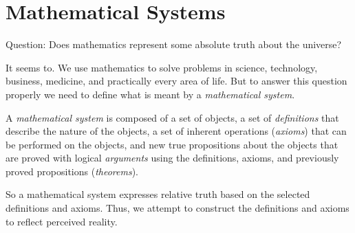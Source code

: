 \documentclass[letterpaper,12pt,fleqn]{article}
\begin{document}
\section*{Mathematical Systems}

Question: Does mathematics represent some absolute truth about the universe?

It seems to.  We use mathematics to solve problems in science, technology, business, medicine, and practically every
area of life.  But to answer this question properly we need to define what is meant by a
\emph{mathematical system}.

\begin{definition}
  A \emph{mathematical system} is composed of a set of objects, a set of \emph{definitions} that describe the
  nature of the objects, a set of inherent operations (\emph{axioms}) that can be performed on the objects, and new
  true propositions about the objects that are proved with logical \emph{arguments} using the definitions, axioms,
  and previously proved propositions (\emph{theorems}).
\end{definition}

\bigskip

\begin{center}
\end{center}

\bigskip

So a mathematical system expresses relative truth based on the selected definitions and axioms.  Thus, we attempt
to construct the definitions and axioms to reflect perceived reality.
\end{document}
